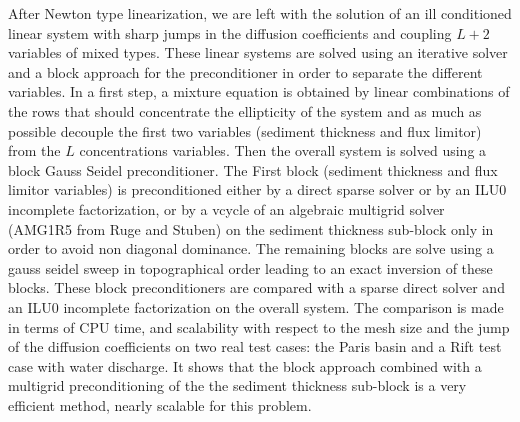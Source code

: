 \documentclass{report}
\begin{document}
After Newton type
linearization, we are left with the solution of an ill conditioned
linear system with sharp jumps in the diffusion coefficients and
coupling $L+2$ variables of mixed types. These linear systems are solved
using an iterative solver and a block approach for the preconditioner
in order to separate the different variables. In a first step, a
mixture equation is obtained by linear combinations of the rows that
should concentrate the ellipticity of the system and as much as
possible decouple the first two variables (sediment thickness and flux
limitor) from the $L$ concentrations variables. Then the overall system
is solved using a block Gauss Seidel preconditioner. The First block
(sediment thickness and flux limitor variables) is preconditioned
either by a direct sparse solver or by an ILU0 incomplete
factorization, or by a vcycle of an algebraic multigrid solver (AMG1R5
from Ruge and Stuben) on the sediment thickness sub-block only in order
to avoid non diagonal dominance. The remaining blocks are solve using a
gauss seidel sweep in topographical order leading to an exact inversion
of these blocks. These block preconditioners are compared with a sparse
direct solver and an ILU0 incomplete factorization on the overall
system. The comparison is made in terms of CPU time, and scalability
with respect to the mesh size and the jump of the diffusion
coefficients on two real test cases: the Paris basin and a Rift test
case with water discharge. It shows that the block approach combined
with a multigrid preconditioning of the the sediment thickness
sub-block is a very efficient method, nearly scalable for this problem.
\end{document}
